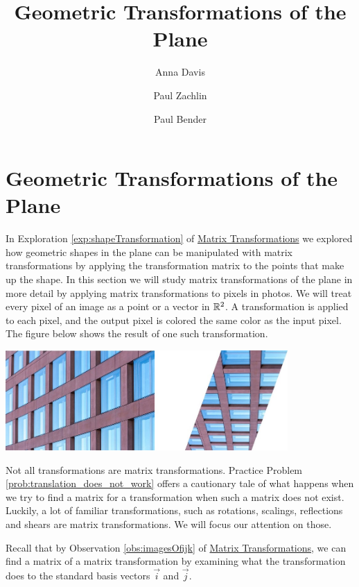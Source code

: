\documentclass{ximera}
\author{Anna Davis \and Paul Zachlin \and Paul Bender} \title{Geometric Transformations of the Plane} \license{CC-BY 4.0}
\begin{document}
\begin{abstract}
 \end{abstract}
\maketitle

\section*{Geometric Transformations of the Plane}
In Exploration \ref{exp:shapeTransformation} of \href{https://ximera.osu.edu/oerlinalg/LinearAlgebra/LTR-0005/main}{Matrix Transformations} we explored how geometric shapes in the plane can be manipulated with matrix transformations by applying the transformation matrix to the points that make up the shape.  In this section we will study matrix transformations of the plane in more detail by applying matrix transformations to pixels in photos.  
We will treat every pixel of an image as a point or a vector in $\mathbb{R}^2$.  A transformation is applied to each pixel, and the output pixel is colored the same color as the input pixel.  The figure below shows the result of one such transformation.

\begin{image}
         \includegraphics[height=1.5in]{twobuildings.jpg}
\end{image}

Not all transformations are matrix transformations.  Practice Problem \ref{prob:translation_does_not_work} offers a cautionary tale of what happens when we try to find a matrix for a transformation when such a matrix does not exist.
Luckily, a lot of familiar transformations, such as rotations, scalings, reflections and shears are matrix transformations. We will focus our attention on those.

Recall that by Observation \ref{obs:imagesOfijk} of \href{https://ximera.osu.edu/oerlinalg/LinearAlgebra/LTR-0005/main}{Matrix Transformations}, we can find a matrix of a matrix transformation by examining what the transformation does to the standard basis vectors $\vec{i}$ and $\vec{j}$. 
\end{document}

